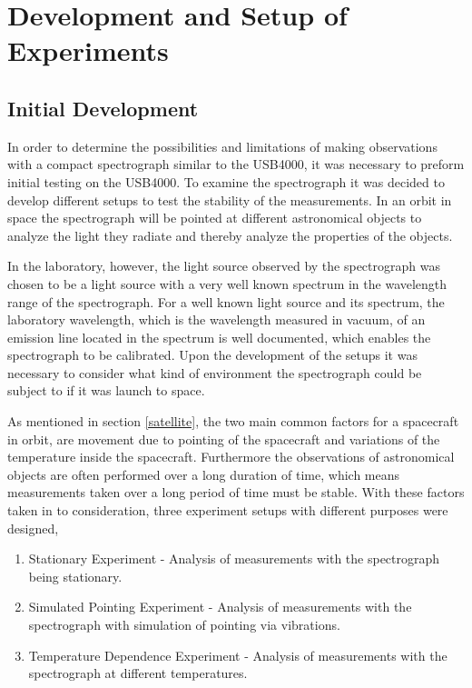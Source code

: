 \chapter{Development and Setup of Experiments}
\section{Initial Development}
In order to determine the possibilities and limitations of making observations with a compact spectrograph similar to the USB4000, it was necessary to preform initial testing on the USB4000. 
To examine the spectrograph it was decided to develop different setups to test the stability of the measurements. In an orbit in space the spectrograph will be pointed at different astronomical objects to analyze the light they radiate and thereby analyze the properties of the objects. 

In the laboratory, however, the light source observed by the spectrograph was chosen to be a light source with a very well known spectrum in the wavelength range of the spectrograph. For a well known light source and its spectrum, the laboratory wavelength, which is the wavelength measured in vacuum, of an emission line located in the spectrum is well documented, which enables the spectrograph to be calibrated.  
Upon the development of the setups it was necessary to consider what kind of environment the spectrograph could be subject to if it was launch to space. 


As mentioned in section \ref{satellite}, the two main common factors for a spacecraft in orbit, are movement due to pointing of the spacecraft and variations of the temperature inside the spacecraft. Furthermore the observations of astronomical objects are often performed over a long duration of time, which means measurements taken over a long period of time must be stable. With these factors taken in to consideration, three experiment setups with different purposes were designed,

\begin{enumerate}
\item Stationary Experiment - Analysis of measurements with the spectrograph being stationary.
\item Simulated Pointing Experiment - Analysis of measurements with the spectrograph with simulation of pointing via vibrations.
\item Temperature Dependence Experiment - Analysis of measurements with the spectrograph at different temperatures.
\end{enumerate}



